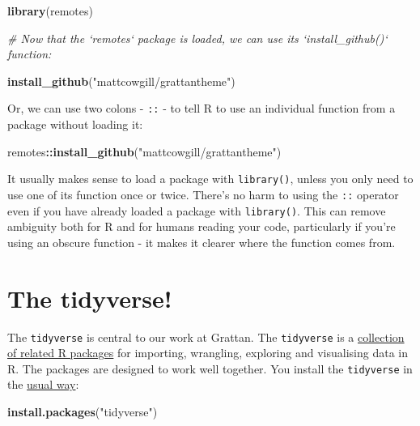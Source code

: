 \documentclass[]{book}
\newenvironment{Shaded}{\begin{snugshade}}{\end{snugshade}}
\newcommand{\CommentTok}[1]{\textcolor[rgb]{0.56,0.35,0.01}{\textit{#1}}}
\newcommand{\KeywordTok}[1]{\textcolor[rgb]{0.13,0.29,0.53}{\textbf{#1}}}
\newcommand{\NormalTok}[1]{#1}
\newcommand{\OperatorTok}[1]{\textcolor[rgb]{0.81,0.36,0.00}{\textbf{#1}}}
\newcommand{\StringTok}[1]{\textcolor[rgb]{0.31,0.60,0.02}{#1}}
\begin{document}
\begin{Shaded}
\begin{Highlighting}[]
\KeywordTok{library}\NormalTok{(remotes)}

\CommentTok{# Now that the `remotes` package is loaded, we can use its `install_github()` function:}

\KeywordTok{install_github}\NormalTok{(}\StringTok{"mattcowgill/grattantheme"}\NormalTok{)}
\end{Highlighting}
\end{Shaded}

Or, we can use two colons - \texttt{::} - to tell R to use an individual function from a package without loading it:

\begin{Shaded}
\begin{Highlighting}[]
\NormalTok{remotes}\OperatorTok{::}\KeywordTok{install_github}\NormalTok{(}\StringTok{"mattcowgill/grattantheme"}\NormalTok{)}
\end{Highlighting}
\end{Shaded}

It usually makes sense to load a package with \texttt{library()}, unless you only need to use one of its function once or twice. There's no harm to using the \texttt{::} operator even if you have already loaded a package with \texttt{library()}. This can remove ambiguity both for R and for humans reading your code, particularly if you're using an obscure function - it makes it clearer where the function comes from.

\hypertarget{tidyverse}{%
\section{The tidyverse!}\label{tidyverse}}

The \texttt{tidyverse} is central to our work at Grattan. The \texttt{tidyverse} is a \href{https://www.tidyverse.org/packages/}{collection of related R packages} for importing, wrangling, exploring and visualising data in R. The packages are designed to work well together. You install the \texttt{tidyverse} in the \protect\hyperlink{install-packages}{usual way}:

\begin{Shaded}
\begin{Highlighting}[]
\KeywordTok{install.packages}\NormalTok{(}\StringTok{"tidyverse"}\NormalTok{)}
\end{Highlighting}
\end{Shaded}
\end{document}

